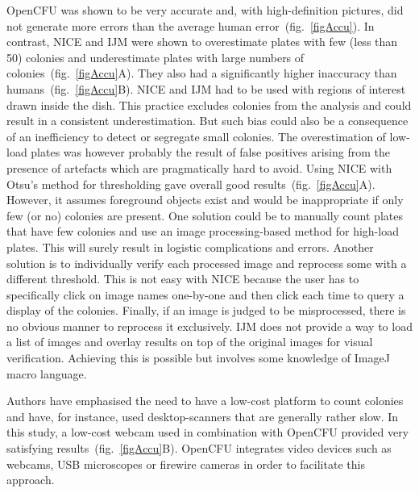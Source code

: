 \documentclass[10pt]{article}
\newcommand{\IJM}{IJM}
\begin{document}
OpenCFU was shown to be very accurate and, with high-definition
pictures, did not generate more errors than the average human error~(fig.~\ref{figAccu}). In contrast, NICE and \IJM{} 
were shown to
overestimate plates with few (less than 50) colonies and underestimate plates
with large numbers 
of colonies~(fig.~\ref{figAccu}A). They also had a significantly
higher inaccuracy than humans~(fig.~\ref{figAccu}B). NICE and \IJM{} had to be
used with regions of interest drawn inside the dish. This practice excludes
colonies from the analysis and could result in a
consistent underestimation. But such bias could also be a consequence of an inefficiency to detect or segregate
 small colonies.
The overestimation of low-load plates was however probably the result of false positives
arising from the presence of artefacts which are pragmatically hard to avoid.
Using NICE with Otsu's method for thresholding gave overall good results~(fig.~\ref{figAccu}A).
However, it assumes foreground objects exist and would be inappropriate
if only few (or no) colonies are present. One
solution could be to manually count plates that have few colonies and use an
image processing-based method for high-load plates. This will surely result in
logistic complications and errors. Another solution is to individually verify
each processed image and reprocess some with a different threshold.
This is not easy with NICE because the user has to specifically click on image
names one-by-one and then click each time to query a display of the colonies.
Finally, if an image is judged to be misprocessed, there is no obvious manner to
reprocess it exclusively.
\IJM{}
does not provide a way to load a list of images and
overlay results on top of the original images for visual verification. Achieving
this is possible but involves some knowledge of ImageJ macro language.


Authors have emphasised the need to have a low-cost platform to count colonies
and have, for instance, used
desktop-scanners\cite{marotz_effective_2001,putman_simplified_2005,clarke_lowcost_2010,cai_optimized_2011
} that are generally rather slow. In this study, a low-cost webcam used in
combination with OpenCFU provided very satisfying results~(fig.~\ref{figAccu}B). OpenCFU integrates
video devices such as webcams, USB microscopes or firewire cameras in order to
facilitate this approach.
\end{document}
